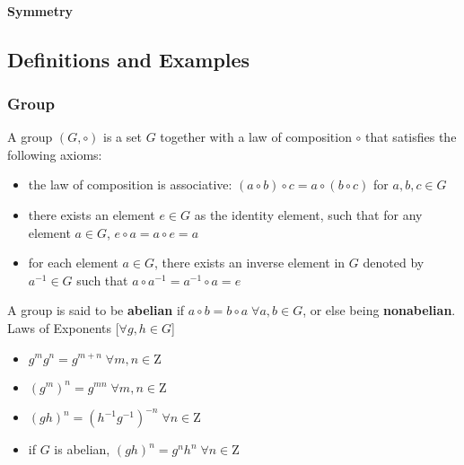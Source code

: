 \documentclass{article}
\begin{document}
\paragraph{Symmetry}
\subsection{Definitions and Examples}
\subsubsection{Group}
A group $(G,\circ)$ is a set $G$ together with a law of composition $\circ$ that satisfies the following axioms:
\begin{itemize}
    \item the law of composition is associative: 
    $(a\circ b)\circ c=a\circ (b\circ c)$ for $a,b,c\in G$
    \item there exists an element $e\in G$ as the identity element, such that for any element $a\in G$, $e\circ a=a\circ e=a$
    \item for each element $a\in G$, there exists an inverse element in $G$ denoted by $a^{-1}\in G$ such that $a\circ a^{-1}=a^{-1}\circ a=e$
\end{itemize}
A group is said to be \textbf{abelian} if $a\circ b=b\circ a \;\forall a,b\in G$, or else being \textbf{nonabelian}.
\\Laws of Exponents [$\forall g,h\in G$]\\
\begin{itemize}
    \item $g^{m}g^{n}=g^{m+n}\;\forall m,n\in \mathrm{Z}$
    \item $(g^m)^n=g^{mn}\;\forall m,n\in \mathrm{Z}$
    \item $(gh)^n=(h^{-1}g^{-1})^{-n}\;\forall n\in \mathrm{Z}$
    \item if $G$ is abelian, $(gh)^n=g^{n}h^{n}\;\forall n\in\mathrm{Z}$
\end{itemize}
\end{document}
